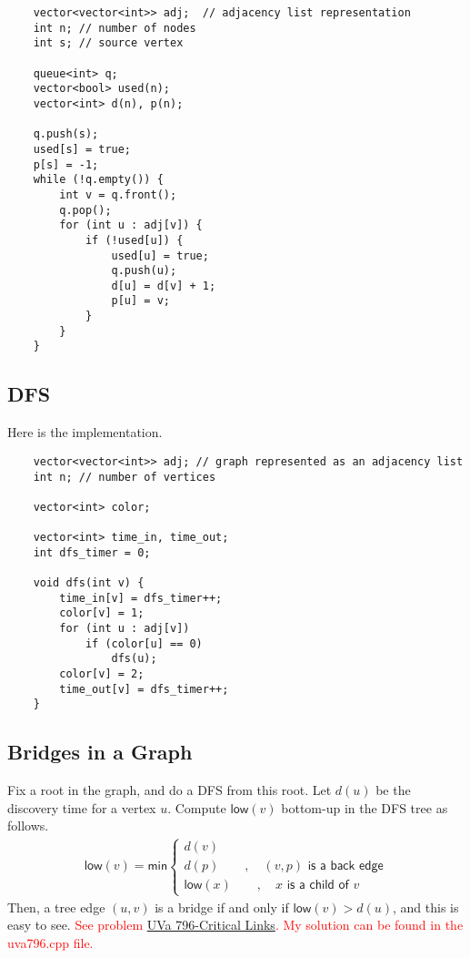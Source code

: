 \documentclass[12pt,a4paper]{amsart}
\numberwithin{equation}{section}
\theoremstyle{definition}
\begin{document}
\begin{lstlisting}
    vector<vector<int>> adj;  // adjacency list representation
    int n; // number of nodes
    int s; // source vertex

    queue<int> q;
    vector<bool> used(n);
    vector<int> d(n), p(n);

    q.push(s);
    used[s] = true;
    p[s] = -1;
    while (!q.empty()) {
        int v = q.front();
        q.pop();
        for (int u : adj[v]) {
            if (!used[u]) {
                used[u] = true;
                q.push(u);
                d[u] = d[v] + 1;
                p[u] = v;
            }
        }
    }
\end{lstlisting}

\subsection{DFS} Here is the implementation. 

\begin{lstlisting}
    vector<vector<int>> adj; // graph represented as an adjacency list
    int n; // number of vertices

    vector<int> color;

    vector<int> time_in, time_out;
    int dfs_timer = 0;

    void dfs(int v) {
        time_in[v] = dfs_timer++;
        color[v] = 1;
        for (int u : adj[v])
            if (color[u] == 0)
                dfs(u);
        color[v] = 2;
        time_out[v] = dfs_timer++;
    }
\end{lstlisting}

\subsection{Bridges in a Graph} Fix a root in the graph, and do a DFS from this root. Let $d(u)$ be the discovery time for a vertex $u$. Compute $\textsf{low}(v)$ bottom-up in the DFS tree as follows. 
\begin{align*}
    \textsf{low}(v) = \textsf{min}\begin{cases}
        d(v)\\
        d(p)\quad\quad , \quad (v , p)\textsf{ is a back edge}\\
        \textsf{low}(x)\quad\quad,\quad x\textsf{ is a child of }v
    \end{cases} 
\end{align*}
Then, a tree edge $(u , v)$ is a bridge if and only if $\textsf{low}(v) > d(u)$, and this is easy to see. \textcolor{red}{See problem \href{https://onlinejudge.org/index.php?option=com_onlinejudge&Itemid=8&page=show_problem&problem=737}{UVa 796-Critical Links}. My solution can be found in the uva796.cpp file.}
\end{document}
